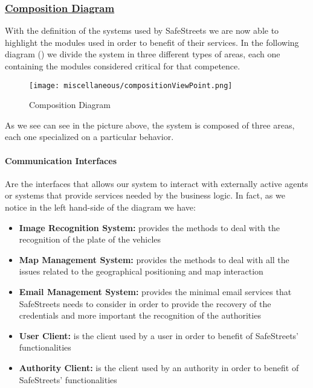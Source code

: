 		\subsubsection[Composition Diagram]{\hyperlink{toc}{Composition Diagram}}
			\label{sec:compositionDiagram}
			
			With the definition of the systems used by SafeStreets we are now able to highlight the modules used in order to benefit of their services. In the following diagram () we divide the system in three different types of areas, each one containing the modules considered critical for that competence.
			
			\newpage
			
			\begin{figure}[ht]
				\centering
				\texttt{[image: miscellaneous/compositionViewPoint.png]}
				\caption{\label{fig:compositionDiagram} Composition Diagram}
			\end{figure}
		
			As we see can see in the picture above, the system is composed of three areas, each one specialized on a particular behavior.
			
			\paragraph{Communication Interfaces} Are the interfaces that allows our system to interact with externally active agents or systems that provide services needed by the business logic. In fact, as we notice in the left hand-side of the diagram we have:
			
			\begin{itemize}
				\item \textbf{Image Recognition System:} provides the methods to deal with the recognition of the plate of the vehicles
				\item \textbf{Map Management System:} provides the methods to deal with all the issues related to the geographical positioning and map interaction
				\item \textbf{Email Management System:} provides the minimal email services that SafeStreets needs to consider in order to provide the recovery of the credentials and more important the recognition of the authorities
				\item \textbf{User Client:} is the client used by a user in order to benefit of SafeStreets' functionalities
				\item \textbf{Authority Client:} is the client used by an authority in order to benefit of SafeStreets' functionalities
			\end{itemize}
		
